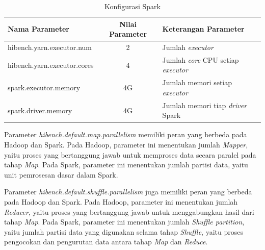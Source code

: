 \begin{table}[h]
\caption{Konfigurasi Spark}
\label{table:conf-spark}
\scriptsize
\centering
\begin{tabular}{l c p{5cm}} 
\hline
\textbf{Nama Parameter} & \textbf{Nilai Parameter} & \textbf{Keterangan Parameter} \\ \hline
hibench.yarn.executor.num & 2 & Jumlah \textit{executor} \\
hibench.yarn.executor.cores & 4 & Jumlah \textit{core} CPU setiap \textit{executor}\\ 
spark.executor.memory & 4G & Jumlah memori setiap \textit{executor} \\
spark.driver.memory & 4G & Jumlah memori tiap \textit{driver} Spark\\ \hline                        
\end{tabular}
\end{table}

Parameter \textit{hibench.default.map.parallelism} memiliki peran yang berbeda pada Hadoop dan Spark. Pada Hadoop, parameter ini menentukan jumlah \textit{Mapper}, yaitu proses yang bertanggung jawab untuk memproses data secara paralel pada tahap \textit{Map}. Pada Spark, parameter ini menentukan jumlah partisi data, yaitu unit pemrosesan dasar dalam Spark.

Parameter \textit{hibench.default.shuffle.parallelism} juga memiliki peran yang berbeda pada Hadoop dan Spark. Pada Hadoop, parameter ini menentukan jumlah \textit{Reducer}, yaitu proses yang bertanggung jawab untuk menggabungkan hasil dari tahap \textit{Map}. Pada Spark, parameter ini menentukan jumlah \textit{Shuffle partition}, yaitu jumlah partisi data yang digunakan selama tahap \textit{Shuffle}, yaitu proses pengocokan dan pengurutan data antara tahap \textit{Map} dan \textit{Reduce}.


